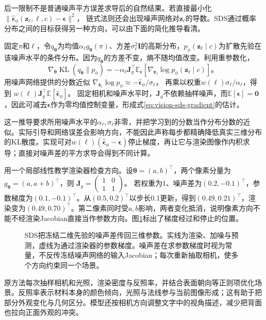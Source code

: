 后一限制不是普通噪声平方误差求导后的自然结果。若直接最小化
$\|\widehat{\bm\epsilon}_\phi(\bm z_\ell,\ell,c)-\bm\epsilon\|^2$，
链式法则还会出现噪声网络对$\bm z_\ell$的导数。SDS通过概率分布之间的目标获得另一种方向，可以由下面的简化推导看清。

固定$\pi$和$\ell$，令$q_{\bm\theta}$为均值$\alpha_\ell g_{\bm\theta}(\pi)$、方差$\sigma_\ell^2\bm I$的高斯分布，$p_\phi(\bm z_\ell\mid c)$为扩散先验在该噪声水平的条件分布。因为$q_{\bm\theta}$的方差不变，熵不随均值改变。利用重参数化，
\[
 \nabla_{\bm\theta}\operatorname{KL}(q_{\bm\theta}\|p_\phi)
 =-\alpha_\ell\bm J_g^\top
     \mathbb E_{\bm\epsilon}
       [\nabla_{\bm z_\ell}\log p_\phi(\bm z_\ell\mid c)]\text{。}
\]
用噪声网络提供的分数近似
$\nabla_{\bm z_\ell}\log p_\phi\approx
-\widehat{\bm\epsilon}_\phi/\sigma_\ell$，
再乘以权重$w(\ell)\sigma_\ell/\alpha_\ell$，得到
$w(\ell)\bm J_g^\top\mathbb E[\widehat{\bm\epsilon}_\phi]$。
固定相机和噪声水平时，$\bm J_g$不依赖抽样噪声，而$\mathbb E[\bm\epsilon]=\bm0$，因此可减去$\bm\epsilon$作为零均值控制变量，形成式\eqref{eq:vision-sds-gradient}的估计。

这一推导要求所用噪声水平的$\alpha_\ell,\sigma_\ell$非零，并把学习到的分数当作分布分数的近似。实际引导和网络误差会影响方向，不能因此声称每步都精确降低真实三维分布的KL散度。实现可对$w(\ell)(\widehat{\bm\epsilon}_\phi-\bm\epsilon)$停止梯度，再让它与渲染图像作内积求导；直接对噪声差的平方求导会得到不同计算。

用一个局部线性教学渲染器检查方向。设$\bm\theta=(a,b)^\top$，两个像素分量为$g_{\bm\theta}=(a,a+b)^\top$，则
$\bm J_g=\left(\begin{smallmatrix}1&0\\1&1\end{smallmatrix}\right)$。
若权重为1、噪声差为$(0.2,-0.1)^\top$，参数梯度为$(0.1,-0.1)^\top$。从$(0.5,0.2)^\top$以步长0.1更新，得到$(0.49,0.21)^\top$，渲染变为$(0.49,0.70)^\top$。第二像素同时受$a,b$影响，两者变化抵消，说明像素方向不能不经渲染Jacobian直接当作参数方向。图\ref{fig:vision-sds-path}标出了梯度经过和停止的位置。

\begin{figure}[htbp]
  \centering
  
  \caption{SDS把冻结二维先验的噪声差传回三维参数。实线为渲染、加噪与预测，虚线为通过渲染器的参数梯度。噪声差在求参数梯度时视为常量，不反传冻结噪声网络的输入Jacobian；每次重新抽取相机，使多个方向约束同一个场景。}
  \label{fig:vision-sds-path}
\end{figure}
\FloatBarrier

原方法每次抽样相机和光照，渲染密度与反照率，并结合表面朝向等正则项优化场景。反照率表示材料本身的颜色倾向，光照与法线参与当前图像形成；这有助于把部分外观变化与几何区分。模型还按相机方向调整文字中的视角描述，减少把背面也拉向正面外观的冲突。

